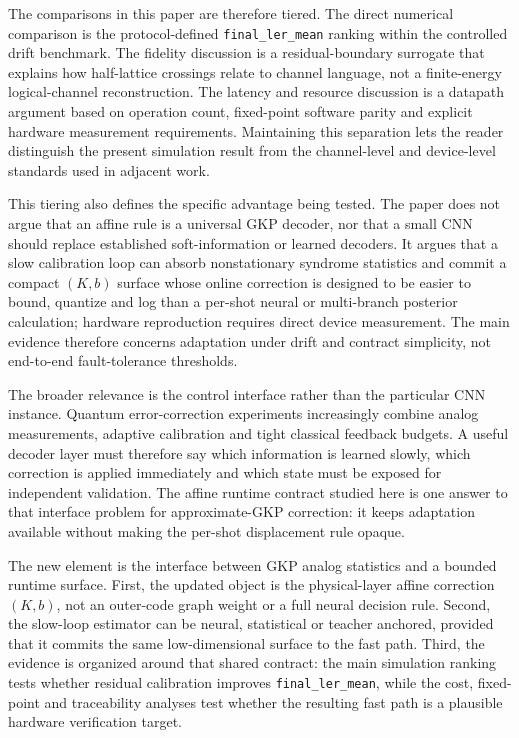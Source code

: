 \documentclass[11pt]{article}
\newcommand{\finalLER}{\texttt{final\_ler\_mean}}
\begin{document}
The comparisons in this paper are therefore tiered.  The direct numerical
comparison is the protocol-defined \finalLER{} ranking within the controlled
drift benchmark.  The fidelity discussion is a residual-boundary surrogate that
explains how half-lattice crossings relate to channel language, not a
finite-energy logical-channel reconstruction.  The latency and resource
discussion is a datapath argument based on operation count, fixed-point
software parity and explicit hardware measurement requirements.  Maintaining
this separation lets the reader
distinguish the present simulation result from the channel-level and
device-level standards used in adjacent work.

This tiering also defines the specific advantage being tested.  The paper does
not argue that an affine rule is a universal GKP decoder, nor that a small CNN
should replace established soft-information or learned decoders.  It argues
that a slow calibration loop can absorb nonstationary syndrome statistics and
commit a compact \((K,b)\) surface whose online correction is designed to be
easier to bound, quantize and log than a per-shot neural or multi-branch
posterior calculation; hardware reproduction requires direct device
measurement.  The main evidence therefore concerns adaptation under drift and
contract simplicity, not end-to-end fault-tolerance thresholds.

The broader relevance is the control interface rather than the particular CNN
instance.  Quantum error-correction experiments increasingly combine analog
measurements, adaptive calibration and tight classical feedback budgets.  A
useful decoder layer must therefore say which information is learned slowly,
which correction is applied immediately and which state must be exposed for
independent validation.  The affine runtime contract studied here is one answer
to that interface problem for approximate-GKP correction: it keeps adaptation
available without making the per-shot displacement rule opaque.

The new element is the interface between GKP analog statistics and a bounded
runtime surface.  First, the updated object is the physical-layer affine
correction \((K,b)\), not an outer-code graph weight or a full neural
decision rule.  Second, the slow-loop estimator can be neural, statistical or
teacher anchored, provided that it commits the same low-dimensional surface to
the fast path.  Third, the evidence is organized around that shared contract:
the main simulation ranking tests whether residual calibration improves
\finalLER{}, while the cost, fixed-point and traceability analyses test whether
the resulting fast path is a plausible hardware verification target.
\end{document}
